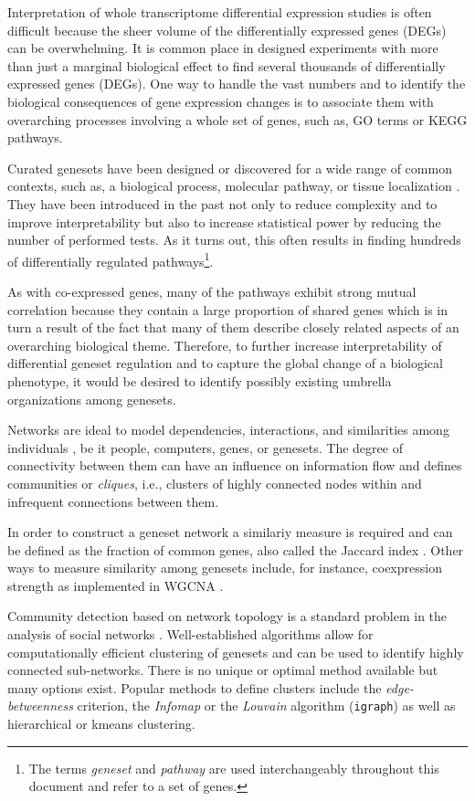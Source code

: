 \documentclass[9pt,a4paper,]{extarticle}
\begin{document}
Interpretation of whole transcriptome differential expression studies is often difficult because the sheer volume of the differentially expressed genes (DEGs) can be overwhelming. It is common place in designed experiments with more than just a marginal biological effect to find several thousands of differentially expressed genes (DEGs). One way to handle the vast numbers and to identify the biological consequences of gene expression changes is to associate them with overarching processes involving a whole set of genes, such as, GO terms or KEGG pathways.

Curated genesets have been designed or discovered for a wide range of common contexts, such as, a biological process, molecular pathway, or tissue localization \citep{Rouillard2016, Liberzon2011}. They have been introduced in the past not only to reduce complexity and to improve interpretability but also to increase statistical power by reducing the number of performed tests. As it turns out, this often results in finding hundreds of differentially regulated pathways\footnote{The terms \emph{geneset} and \emph{pathway} are used interchangeably throughout this document and refer to a set of genes.}.

As with co-expressed genes, many of the pathways exhibit strong mutual correlation because they contain a large proportion of shared genes which is in turn a result of the fact that many of them describe closely related aspects of an overarching biological theme. Therefore, to further increase interpretability of differential geneset regulation and to capture the global change of a biological phenotype, it would be desired to identify possibly existing umbrella organizations among genesets.

Networks are ideal to model dependencies, interactions, and similarities among individuals \citep{Barabasi2004, Vidal2011, Ideker2012}, be it people, computers, genes, or genesets. The degree of connectivity between them can have an influence on information flow and defines communities or \emph{cliques}, i.e., clusters of highly connected nodes within and infrequent connections between them.

In order to construct a geneset network a similariy measure is required and can be defined as the fraction of common genes, also called the Jaccard index \citep{Merico2010}. Other ways to measure similarity among genesets include, for instance, coexpression strength as implemented in WGCNA \citep{Langfelder2008, Thorsson2018}.

Community detection based on network topology is a standard problem in the analysis of social networks \citep{Girvan2002, Bedi2016}. Well-established algorithms allow for computationally efficient clustering of genesets and can be used to identify highly connected sub-networks. There is no unique or optimal method available but many options exist. Popular methods to define clusters include the \emph{edge-betweenness} criterion, the \emph{Infomap} or the \emph{Louvain} algorithm (\texttt{igraph}) as well as hierarchical or kmeans clustering.
\end{document}
